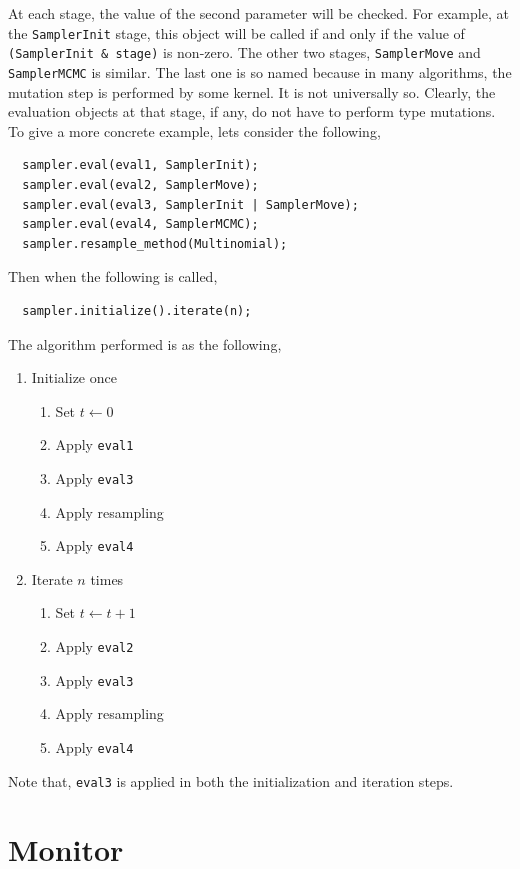 At each stage, the value of the second parameter will be checked. For example,
at the \verb|SamplerInit| stage, this object will be called if and only if the
value of \verb|(SamplerInit & stage)| is non-zero. The other two stages,
\verb|SamplerMove| and \verb|SamplerMCMC| is similar. The last one is so named
because in many algorithms, the mutation step is performed by some \mcmc
kernel. It is not universally so. Clearly, the evaluation objects at that
stage, if any, do not have to perform \mcmc type mutations. To give a more
concrete example, lets consider the following,
\begin{Verbatim}
  sampler.eval(eval1, SamplerInit);
  sampler.eval(eval2, SamplerMove);
  sampler.eval(eval3, SamplerInit | SamplerMove);
  sampler.eval(eval4, SamplerMCMC);
  sampler.resample_method(Multinomial);
\end{Verbatim}
Then when the following is called,
\begin{Verbatim}
  sampler.initialize().iterate(n);
\end{Verbatim}
The algorithm performed is as the following,
\begin{enumerate}
  \item Initialize once
    \begin{enumerate}
      \item Set $t \leftarrow 0$
      \item Apply \verb|eval1|
      \item Apply \verb|eval3|
      \item Apply resampling
      \item Apply \verb|eval4|
    \end{enumerate}
  \item Iterate $n$ times
    \begin{enumerate}
      \item Set $t \leftarrow t + 1$
      \item Apply \verb|eval2|
      \item Apply \verb|eval3|
      \item Apply resampling
      \item Apply \verb|eval4|
    \end{enumerate}
\end{enumerate}
Note that, \verb|eval3| is applied in both the initialization and iteration
steps.

\section{Monitor}
\label{sec:Monitor}

